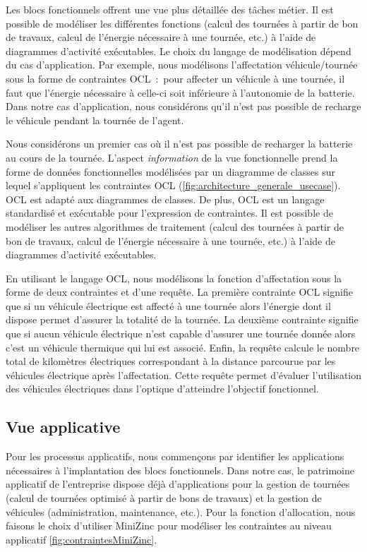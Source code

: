 Les blocs fonctionnels offrent une vue plus détaillée des tâches métier. Il est possible de modéliser les différentes fonctions (calcul des tournées à partir de bon de travaux, calcul de l'énergie nécessaire à une tournée, etc.) à l'aide de diagrammes d'activité exécutables. Le choix du langage de modélisation dépend du cas d'application. Par exemple, nous modélisons l'affectation véhicule/tournée sous la forme de contraintes OCL~:~pour affecter un véhicule à une tournée, il faut que l'énergie nécessaire à celle-ci soit inférieure à l'autonomie de la batterie. Dans notre cas d'application, nous considérons qu'il n'est pas possible de recharge le véhicule pendant la tournée de l'agent.

Nous considérons un premier cas où il n'est pas possible de recharger la batterie au cours de la tournée. L'aspect \emph{information} de la vue fonctionnelle prend la forme de données fonctionnelles  modélisées par un diagramme de classes sur lequel s'appliquent les contraintes OCL (\ref{fig:architecture_generale_usecase}). OCL est adapté aux diagrammes de classes. De plus, OCL est un langage standardisé et exécutable pour l'expression de contraintes. Il est possible de modéliser les autres algorithmes de traitement (calcul des tournées à partir de bon de travaux, calcul de l'énergie nécessaire à une tournée, etc.) à l'aide de diagrammes d'activité exécutables.

En utilisant le langage OCL, nous modélisons la fonction d'affectation sous la forme de deux contraintes et d'une requête. La première contrainte OCL signifie que si un véhicule électrique est affecté à une tournée alors l'énergie dont il dispose permet d'assurer la totalité de la tournée.
La deuxième contrainte signifie que si aucun véhicule électrique n'est capable d'assurer une tournée donnée alors c'est un véhicule thermique qui lui est associé. Enfin, la requête calcule le nombre total de kilomètres électriques correspondant à la distance parcourue par les véhicules électrique après l'affectation. Cette requête permet d'évaluer l'utilisation  des véhicules électriques dans l'optique d'atteindre l'objectif fonctionnel. 



\subsection{Vue applicative}

Pour les processus applicatifs, nous commençons par identifier 
les applications nécessaires à l'implantation des blocs fonctionnels. Dans notre cas, le patrimoine applicatif de l'entreprise dispose déjà d'applications pour la gestion de tournées (calcul de tournées optimisé à partir de bons de travaux) et la gestion de véhicules (administration, maintenance, etc.). Pour la fonction d'allocation, nous faisons le choix d'utiliser MiniZinc pour modéliser les contraintes au niveau applicatif \ref{fig:contraintesMiniZinc}. 

